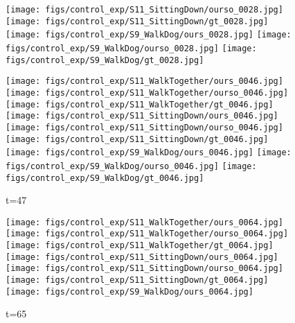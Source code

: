 \documentclass{article}
\begin{document}
\begin{appendix}
\begin{figure*}[!thbp]
\begin{subfigure}{0.12\linewidth}
  		\texttt{[image: figs/control\_exp/S11\_SittingDown/ourso\_0028.jpg]}
  		\vspace{.2cm}
  		\texttt{[image: figs/control\_exp/S11\_SittingDown/gt\_0028.jpg]}
  		\texttt{[image: figs/control\_exp/S9\_WalkDog/ours\_0028.jpg]}
  		\texttt{[image: figs/control\_exp/S9\_WalkDog/ourso\_0028.jpg]}
  		\vspace{.2cm}
  		\texttt{[image: figs/control\_exp/S9\_WalkDog/gt\_0028.jpg]}
	\end{subfigure} 
    \begin{subfigure}{0.12\linewidth}
        \caption*{t=47}
        \vspace{-7pt}
	    \texttt{[image: figs/control\_exp/S11\_WalkTogether/ours\_0046.jpg]}
	    \texttt{[image: figs/control\_exp/S11\_WalkTogether/ourso\_0046.jpg]}
	    \vspace{.2cm}
  		\texttt{[image: figs/control\_exp/S11\_WalkTogether/gt\_0046.jpg]}
  		\texttt{[image: figs/control\_exp/S11\_SittingDown/ours\_0046.jpg]}
  		\texttt{[image: figs/control\_exp/S11\_SittingDown/ourso\_0046.jpg]}
  		\vspace{.2cm}
  		\texttt{[image: figs/control\_exp/S11\_SittingDown/gt\_0046.jpg]}
  		\texttt{[image: figs/control\_exp/S9\_WalkDog/ours\_0046.jpg]}
  		\texttt{[image: figs/control\_exp/S9\_WalkDog/ourso\_0046.jpg]}
  		\vspace{.2cm}
  		\texttt{[image: figs/control\_exp/S9\_WalkDog/gt\_0046.jpg]}
	\end{subfigure} 
    \begin{subfigure}{0.12\linewidth}
        \caption*{t=65}
        \vspace{-7pt}
	    \texttt{[image: figs/control\_exp/S11\_WalkTogether/ours\_0064.jpg]}
	    \texttt{[image: figs/control\_exp/S11\_WalkTogether/ourso\_0064.jpg]}
	    \vspace{.2cm}
  		\texttt{[image: figs/control\_exp/S11\_WalkTogether/gt\_0064.jpg]}
  		\texttt{[image: figs/control\_exp/S11\_SittingDown/ours\_0064.jpg]}
  		\texttt{[image: figs/control\_exp/S11\_SittingDown/ourso\_0064.jpg]}
  		\vspace{.2cm}
  		\texttt{[image: figs/control\_exp/S11\_SittingDown/gt\_0064.jpg]}
  		\texttt{[image: figs/control\_exp/S9\_WalkDog/ours\_0064.jpg]}

\end{subfigure}
\end{figure*}
\end{appendix}
\end{document}
